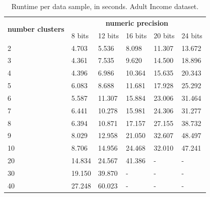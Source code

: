 \begin{table}[H]
\centering
\caption{Runtime per data sample, in seconds. Adult Income dataset.}
\label{table:runtimeKMAI}
\begin{tabular}{|l|l|l|l|l|l|}
\hline
\multirow{2}{*}{\textbf{number clusters}} & \multicolumn{5}{c|}{\textbf{numeric precision}}                                              \\ \cline{2-6}
                                          & 8 bits & 12 bits & 16 bits & 20 bits & 24 bits \\ \hline
2                                & 4.703           & 5.536            & 8.098            & 11.307           & 13.672           \\ \hline
3                                & 4.361           & 7.535            & 9.620            & 14.500           & 18.896           \\ \hline
4                                & 4.396           & 6.986            & 10.364           & 15.635           & 20.343           \\ \hline
5                                & 6.083           & 8.688            & 11.681           & 17.928           & 25.292           \\ \hline
6                                & 5.587           & 11.307           & 15.884           & 23.006           & 31.464           \\ \hline
7                                & 6.441           & 10.278           & 15.981           & 24.306           & 31.277           \\ \hline
8                                & 6.394           & 10.871           & 17.157           & 27.155           & 38.732           \\ \hline
9                                & 8.029           & 12.958           & 21.050           & 32.607           & 48.497           \\ \hline
10                               & 8.706           & 14.956           & 24.468           & 32.010           & 47.241           \\ \hline
20                               & 14.834          & 24.567           & 41.386           & -                & -                \\ \hline
30                               & 19.150          & 39.870           & -                & -                & -                \\ \hline
40                               & 27.248          & 60.023           & -                & -                & -                \\ \hline

\end{tabular}
\end{table}
